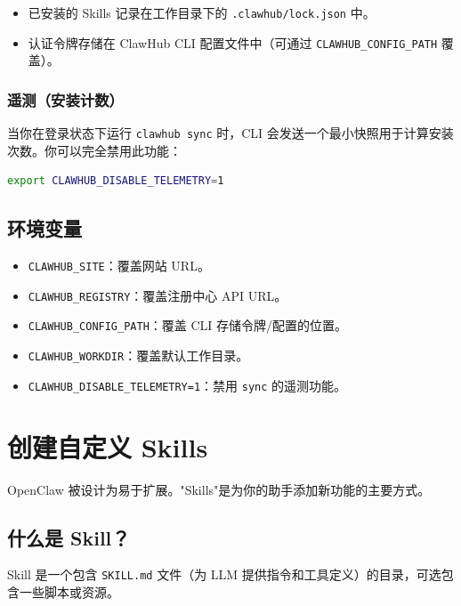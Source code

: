 \begin{itemize}
  \item 已安装的 Skills 记录在工作目录下的 \texttt{.clawhub/lock.json} 中。
  \item 认证令牌存储在 ClawHub CLI 配置文件中（可通过 \texttt{CLAWHUB\_CONFIG\_PATH} 覆盖）。
\end{itemize}


\subsubsection{遥测（安装计数）}


当你在登录状态下运行 \texttt{clawhub sync} 时，CLI 会发送一个最小快照用于计算安装次数。你可以完全禁用此功能：

\begin{lstlisting}[language=bash]
export CLAWHUB_DISABLE_TELEMETRY=1
\end{lstlisting}


\subsection{环境变量}


\begin{itemize}
  \item \texttt{CLAWHUB\_SITE}：覆盖网站 URL。
  \item \texttt{CLAWHUB\_REGISTRY}：覆盖注册中心 API URL。
  \item \texttt{CLAWHUB\_CONFIG\_PATH}：覆盖 CLI 存储令牌/配置的位置。
  \item \texttt{CLAWHUB\_WORKDIR}：覆盖默认工作目录。
  \item \texttt{CLAWHUB\_DISABLE\_TELEMETRY=1}：禁用 \texttt{sync} 的遥测功能。
\end{itemize}



\clearpage

\section{创建自定义 Skills}


OpenClaw 被设计为易于扩展。"Skills"是为你的助手添加新功能的主要方式。

\subsection{什么是 Skill？}


Skill 是一个包含 \texttt{SKILL.md} 文件（为 LLM 提供指令和工具定义）的目录，可选包含一些脚本或资源。


